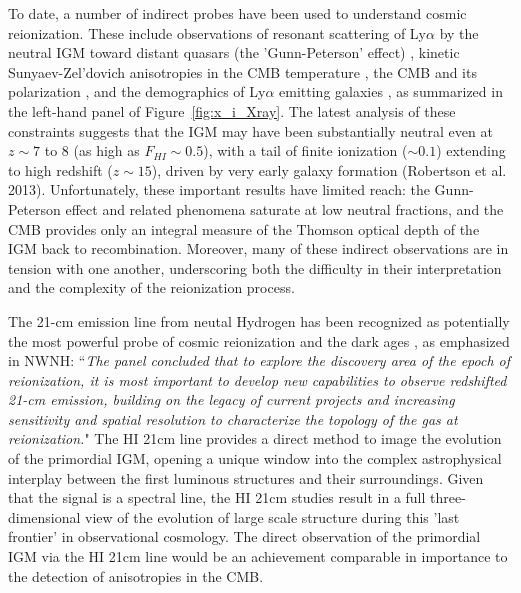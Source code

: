\documentclass[preprint]{aastex}
\begin{document}
To date, a number of indirect probes have been used to understand
cosmic reionization. These include observations of resonant scattering
of Ly$\alpha$ by the neutral IGM toward distant quasars (the
'Gunn-Peterson' effect) \citep{fan_et_al2006}, kinetic
Sunyaev-Zel'dovich anisotropies in the CMB temperature
\citep{zahn_et_al2012_trunc}, the CMB \citep{planck_et_al2013} and its
polarization \citep{page_et_al2007}, and the demographics of
Ly$\alpha$ emitting galaxies \citep{treu_et_al2013}, as summarized in
the left-hand panel of Figure~\ref{fig:x_i_Xray}. The latest analysis
of these constraints suggests that the IGM may have been substantially
neutral even at $z \sim 7$ to 8 (as high as $F_{HI} \sim 0.5$), with
a tail of finite ionization ($\sim 0.1$) extending to high redshift
($z \sim 15$), driven by very early galaxy formation (Robertson et
al. 2013).  Unfortunately, these important results have limited
reach: the Gunn-Peterson effect and related phenomena saturate at low
neutral fractions, and the CMB provides only an integral measure of
the Thomson optical depth of the IGM back to recombination. Moreover,
many of these indirect observations are in tension with one another,
underscoring both the difficulty in their interpretation and the
complexity of the reionization process.

The 21-cm emission line from neutal Hydrogen has been recognized as
potentially the most powerful probe of cosmic reionization and 
the dark ages \citep{morales_wyithe2010,
furlanetto_et_al2006}, as emphasized in NWNH: ``{\it The panel
concluded that to explore the discovery area of the epoch of
reionization, it is most important to develop new capabilities to
observe redshifted 21-cm \HI emission, building on the legacy of
current projects and increasing sensitivity and spatial resolution to
characterize the topology of the gas at reionization.}"  The HI 21cm
line provides a direct method to image the evolution of the primordial
IGM, opening a unique window into the complex astrophysical
interplay between the first luminous structures and their
surroundings. Given that the signal is a spectral line, the HI 21cm
studies result in a full three-dimensional view of the evolution of
large scale structure during this 'last frontier' in observational
cosmology. The direct observation of the primordial IGM via
the HI 21cm line would be an achievement comparable in importance to
the detection of anisotropies in the CMB.
\end{document}
